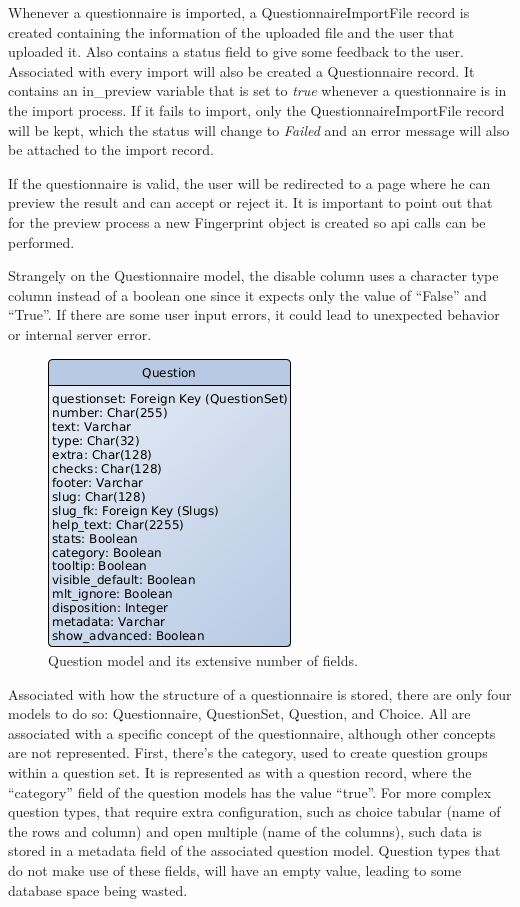 Whenever a questionnaire is imported, a QuestionnaireImportFile record is created containing the information of the uploaded file and the user that uploaded it.
Also contains a status field to give some feedback to the user.
Associated with every import will also be created a Questionnaire record.
It contains an in\_preview variable that is set to \textit{true} whenever a questionnaire is in the import process.
If it fails to import, only the QuestionnaireImportFile record will be kept, which the status will change to \textit{Failed} and an error message will also be attached to the import record.

If the questionnaire is valid, the user will be redirected to a page where he can preview the result and can accept or reject it.
It is important to point out that for the preview process a new Fingerprint object is created so \gls{api} calls can be performed.

Strangely on the Questionnaire model, the disable column uses a character type column instead of a boolean one since it expects only the value of ``False'' and ``True''.
If there are some user input errors, it could lead to unexpected behavior or internal server error.


\begin{figure}[H]
    \center
    \includegraphics[width=.3\textwidth]{question-model}
    \caption{Question model and its extensive number of fields.}
    \label{fig:question-model}
\end{figure}

Associated with how the structure of a questionnaire is stored, there are only four models to do so: Questionnaire, QuestionSet, Question, and Choice.
All are associated with a specific concept of the questionnaire, although other concepts are not represented.
First, there's the category, used to create question groups within a question set.
It is represented as with a question record, where the ``category'' field of the question models has the value ``true''.
For more complex question types, that require extra configuration, such as choice tabular (name of the rows and column) and open multiple (name of the columns), such data is stored in a metadata field of the associated question model.
Question types that do not make use of these fields, will have an empty value, leading to some database space being wasted.

